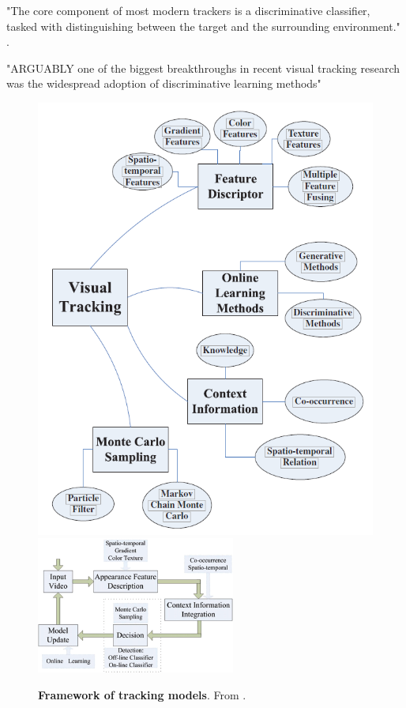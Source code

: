 "The core component of most modern trackers is a discriminative classifier, tasked with distinguishing between the target
and the surrounding environment." \cite{henriques2015tracking}.

"ARGUABLY one of the biggest breakthroughs in recent
visual tracking research was the widespread adoption
of discriminative learning methods" \cite{henriques2015tracking}

\begin{figure}
   \hspace{-2mm}
   \includegraphics[width=0.45\linewidth]{figures/yang2011recent_graph.png}
   \includegraphics[width=0.45\linewidth]{figures/yang2011recent_flowchart.png}
   \caption{\textbf{Framework of tracking models}. From \cite{avidan2004support}.}
   \label{fig:yang2011recent}
\end{figure}




